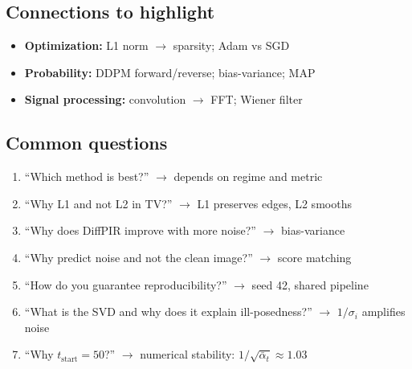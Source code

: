 \documentclass[english,11pt,a4paper]{article}
\begin{document}
\subsection*{Connections to highlight}
\begin{itemize}
\item \textbf{Optimization:} L1 norm $\to$ sparsity; Adam vs SGD
\item \textbf{Probability:} DDPM forward/reverse; bias-variance; MAP
\item \textbf{Signal processing:} convolution $\to$ FFT; Wiener filter
\end{itemize}

\subsection*{Common questions}
\begin{enumerate}
\item ``Which method is best?'' $\to$ depends on regime and metric
\item ``Why L1 and not L2 in TV?'' $\to$ L1 preserves edges, L2 smooths
\item ``Why does DiffPIR improve with more noise?'' $\to$ bias-variance
\item ``Why predict noise and not the clean image?'' $\to$ score matching
\item ``How do you guarantee reproducibility?'' $\to$ seed 42, shared pipeline
\item ``What is the SVD and why does it explain ill-posedness?'' $\to$ $1/\sigma_i$ amplifies noise
\item ``Why $t_{\text{start}}=50$?'' $\to$ numerical stability: $1/\sqrt{\bar{\alpha}_t} \approx 1.03$
\end{enumerate}
\end{document}

